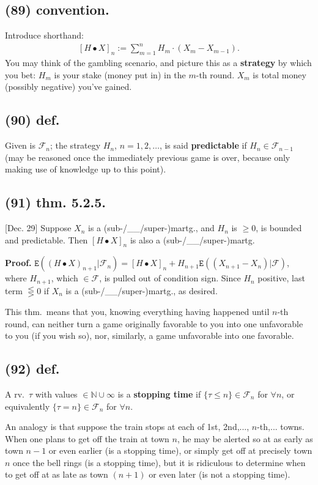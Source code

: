\documentclass[12pt]{article}
\newcommand{\oo}\infty%
\newcommand{\M}\cdot%
\newcommand{\Ev}\forall%
\newcommand{\Rb}[1]{ \left( #1 \right) }%
\newcommand{\BF}[1]{ \mathbb{#1} }%
\newcommand{\SF}[1]{ \mathscr{#1} }%
\newcommand{\Ss}[1]{\textsf{\bfseries{#1}}}%
\newcommand{\Tw}[1]{\texttt{#1}}%
\newcommand{\EqGo}[1]{ \begin{gather*}{#1}\end{gather*} } %
\newcommand{\E}[1]{ \Tw{E}\Rb{#1} }%
\begin{document}
\subsection*{(89) convention.} Introduce shorthand: \EqGo{
 [H \bullet X]_n :=\sum_{m=1}^n H_m \M (X_m -X_{m-1}).
} You may think of the gambling scenario, and picture this as a \Ss{strategy} by which you bet: 
\(H_m\) is your stake (money put in) in the \(m\)-th round. 
\(X_m\) is total money (possibly negative) you've gained. 

\subsection*{(90) def.} Given is \(\SF{F}_n\); the strategy \(H_n\), \(n=1,2,\dotsc\), is said \Ss{predictable} if \(H_n \in \SF{F}_{n-1}\) (may be reasoned once the immediately previous game is over, because only making use of knowledge up to this point). 

\subsection*{(91) thm. 5.2.5.} [Dec. 29] Suppose \(X_n\) is a (sub-/\_\_/super-)martg., and \(H_n\) is \(\geq 0\), is bounded and predictable. 
Then \([H \bullet X]_n\) is also a (sub-/\_\_/super-)martg. \par
\Ss{Proof.} \(\E{(H \bullet X)_{n+1} \Big| \SF{F}_n} =[H \bullet X]_n +H_{n+1} \E{(X_{n+1} -X_n) \Big| \SF{F}}\), where \(H_{n+1}\), which \(\in \SF{F}\), is pulled out of condition sign. 
Since \(H_n\) positive, last term \(\lesseqgtr 0\) if \(X_n\) is a (sub-/\_\_/super-)martg., as desired. \par
This thm.\ means that you, knowing everything having happened until \(n\)-th round, can neither turn a game originally favorable to you into one unfavorable to you (if you wish so), nor, similarly, a game unfavorable into one favorable. 

\subsection*{(92) def.} A rv.\ \(\tau\) with values \(\in \BF{N} \cup \oo\) is a \Ss{stopping time} if \(\{\tau \leq n\} \in \SF{F}_n\) for \(\Ev n\), or equivalently \(\{\tau =n\} \in \SF{F}_n\) for \(\Ev n\). \par
An analogy is that suppose the train stops at each of 1st, 2nd,..., \(n\)-th,... towns. 
When one plans to get off the train at town \(n\), he may be alerted so at as early as town \(n-1\) or even earlier (is a stopping time), or simply get off at precisely town \(n\) once the bell rings (is a stopping time), but it is ridiculous to determine when to get off at as late as town \((n+1)\) or even later (is not a stopping time). 
\end{document}
